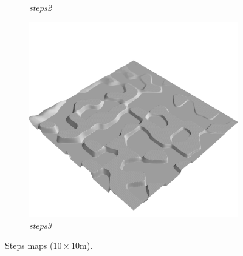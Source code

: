 \documentclass[../document.tex]{subfiles}
\begin{document}
\begin{figure}[H]
\begin{subfigure}[b]{0.32\linewidth}
            \caption{\emph{steps2}}
            \end{subfigure}    
          \begin{subfigure}[b]{0.32\textwidth}
            \includegraphics[width=\textwidth]{../img/hm3d/steps3.png}
            \caption{\emph{steps3}}
        \end{subfigure}    
    \label{fig: heightmaps}
    \caption{Steps maps ($10\times10$m).}
\end{figure}
\end{document}
